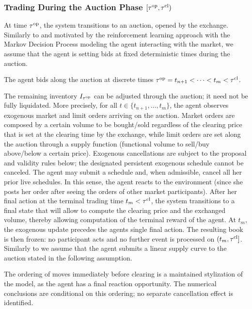 \documentclass[11pt]{article}
\begin{document}
\subsubsection{Trading During the Auction Phase \texorpdfstring{$[\tau^{\mathrm{op}}, \tau^{\mathrm{cl}})$}{}} \label{sec:auction} At time $\tau^{\mathrm{op}}$, the system transitions to an auction, opened by the exchange. Similarly to \cite{derchu2024ahead,mastrolia2024clearing} and motivated by the reinforcement learning approach with the Markov Decision Process modeling the agent interacting with the market, we assume that the agent is setting bids at fixed deterministic times during the auction.  

\begin{assumption}
    The agent bids along the auction at discrete times $\tau^{\mathrm{op}}=t_{n+1}<\dots<t_m<\tau^{\mathrm{cl}}$.
\end{assumption}
{The remaining inventory $I_{\tau^{\mathrm{op}}}$ can be adjusted through the auction; it need not be fully liquidated.} More precisely, for all $t \in \{t_{n+1},\dots,t_m\}$, the agent observes exogenous market and limit orders arriving on the auction. Market orders are composed by a certain volume to be bought/sold regardless of the clearing price that is set at the clearing time by the exchange, while limit orders are set along the auction through a supply function (functional volume to sell/buy above/below a certain price). {Exogenous cancellations are subject to the proposal and validity rules below; the designated persistent exogenous schedule cannot be canceled. The agent may submit a schedule and, when admissible, cancel all her prior live schedules.} In this sense, the agent reacts to the environment (since she posts her order after seeing the orders of other market participants). After her final action at the terminal trading time $t_m<\tau^{\mathrm{cl}}$, the system transitions to a final state that will allow to compute the clearing price and the exchanged volume, thereby allowing computation of the terminal reward of the agent. {At $t_m$, the exogenous update precedes the agent\textquotesingle s single final action. The resulting book is then frozen: no participant acts and no further event is processed on $(t_m,\tau^{\mathrm{cl}}]$.} Similarly to \cite{du2014welfare,paul2021optimal,mastrolia2025optimal} we assume that the agent submits a linear supply curve to the auction stated in the following assumption.

\begin{remark}
The ordering of moves immediately before clearing is a maintained stylization of the model, as the agent has a final reaction opportunity. {The numerical conclusions are conditional on this ordering; no separate cancellation effect is identified.}
\end{remark}
\end{document}
